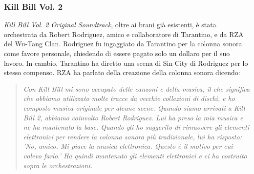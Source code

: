 \documentclass[12pt]{article} %
\begin{document}
            \subsubsection*{Kill Bill Vol. 2}
            \begin{flushleft}
                \textit{Kill Bill Vol. 2 Original Soundtrack}, oltre ai brani già esistenti, è stata orchestrata da Robert Rodriguez, amico e collaboratore di Tarantino, e da RZA del Wu-Tang Clan. Rodriguez fu ingaggiato da Tarantino per la colonna sonora come favore personale, chiedendo di essere pagato solo un dollaro per il suo lavoro. In cambio, Tarantino ha diretto una scena di Sin City di Rodriguez per lo stesso compenso. RZA ha parlato della creazione della colonna sonora dicendo:
                \begin{quote}\textit{
                    Con Kill Bill mi sono occupato delle canzoni e della musica, il che significa che abbiamo utilizzato molte tracce da vecchie collezioni di dischi, e ho composto musica originale per alcune scene. Quando siamo arrivati a Kill Bill 2, abbiamo coinvolto Robert Rodriguez. Lui ha preso la mia musica e ne ha mantenuto la base. Quando gli ho suggerito di rimuovere gli elementi elettronici per rendere la colonna sonora più tradizionale, lui ha risposto: 'No, amico. Mi piace la musica elettronica. Questo è il motivo per cui volevo farlo.' Ha quindi mantenuto gli elementi elettronici e ci ha costruito sopra le orchestrazioni.
                }\end{quote}
            \end{flushleft}
                \small
\end{document}
